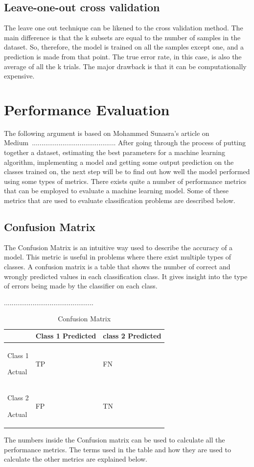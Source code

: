 \documentclass[12pt, a4paper,oneside]{report}
\begin{document}
\subsection{Leave-one-out cross validation}
The leave one out technique can be likened to the cross validation method. The main difference is that the k subsets are equal to the number of samples in the dataset. So, therefore, the model is trained on all the samples except one, and a prediction is made from that point. The true error rate, in this case, is also the average of all the k trials. The major drawback is that it can be computationally expensive.


\section{Performance Evaluation}
The following argument is based on Mohammed Sunasra's article on Medium~\cite{performance}............................................
After going through the process of putting together a dataset, estimating the best parameters for a machine learning algorithm, implementing a model and getting some output prediction on the classes trained on, the next step will be to find out how well the model performed using some types of metrics. There exists quite a number of performance metrics that can be employed to evaluate a machine learning model. Some of these metrics that are used to evaluate classification problems are described below.

\subsection{Confusion Matrix}
The Confusion Matrix is an intuitive way used to describe the accuracy of a model. This metric is useful in problems where there exist multiple types of classes. A confusion matrix is a table that shows the number of correct and wrongly predicted values in each classification class. It gives insight into the type of errors being made by the classifier on each class.

...............................................
\begin{table}[h]
	\centering {} \small
	\begin{tabular}{|p{4cm}|p{4cm}|p{4cm}|}
		\hline
		  & Class 1 Predicted & class 2 Predicted \\ \hline
		Class 1 \par Actual & TP & FN \\ \hline
		Class 2 \par Actual & FP & TN \\ \hline
			
	\end{tabular}
	\caption {Confusion Matrix}	
	\label{table:confusion}
	\end{table}
The numbers inside the Confusion matrix can be used to calculate 
all the performance metrics. The terms used in the table and how they are used to calculate the other metrics are explained below.
\end{document}
